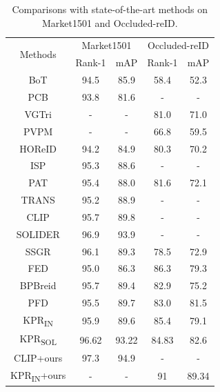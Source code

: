 \begin{table}
\centering
\renewcommand\tabcolsep{5pt}

\begin{tabular}{c|cc|cc}
\hline
 \multirow{2}{*}{Methods}& \multicolumn{2}{c|}{Market1501} & \multicolumn{2}{c}{Occluded-reID} \\ \cline{2-5}
 & Rank-1 & mAP & Rank-1  & mAP \\
\hline
BoT\cite{luo2019bag} & 94.5 & 85.9 & 58.4 & 52.3 \\
PCB\cite{sun2018beyond}& 93.8 & 81.6& - & - \\
VGTri\cite{yang2021learning} & - & - & 81.0 & 71.0 \\
PVPM\cite{gao2020pose} & - & - & 66.8 & 59.5 \\
HOReID\cite{wang2020high} & 94.2 & 84.9 & 80.3 & 70.2 \\
ISP\cite{zhu2020identity} & 95.3 & 88.6 & - & -\\
PAT\cite{li2021diverse} & 95.4 & 88.0 & 81.6 & 72.1 \\
TRANS\cite{he2021transreid} & 95.2 & 88.9 & - & - \\
CLIP\cite{li2023clip} & 95.7 & 89.8 & - & - \\
SOLIDER\cite{chen2023beyond} & 96.9 & 93.9 & - & - \\
SSGR\cite{yan2021occluded} & 96.1 & 89.3 & 78.5 & 72.9 \\
FED\cite{wang2022feature} & 95.0 & 86.3& 86.3 & 79.3 \\
BPBreid\cite{somers2023body} & 95.7 & 89.4 & 82.9 & 75.2\\
PFD\cite{wang2022pose} & 95.5 & 89.7 & 83.0 & 81.5 \\
KPR\textsubscript{IN}\cite{somers2025keypoint} & 95.9 & 89.6 & 85.4 & 79.1 \\
KPR\textsubscript{SOL}\cite{somers2025keypoint} & 96.62 &93.22 &84.83& 82.6\\
\hline
\rowcolor{gray!20}
CLIP+ours & 97.3 & 94.9 & - & -\\
\rowcolor{gray!20}
KPR\textsubscript{IN}+ours & - & - & 91 & 89.34 \\
\hline
\end{tabular}
\caption{Comparisons with state-of-the-art methods on Market1501 and Occluded-reID.}
\label{tab:sota}
\end{table}
